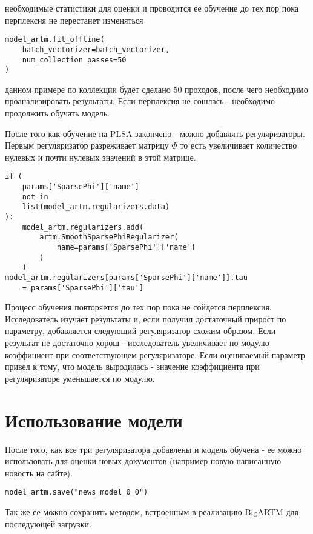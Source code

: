 необходимые статистики для оценки и проводится ее обучение до тех пор пока перплексия не перестанет изменяться

\begin{lstlisting}
model_artm.fit_offline(
    batch_vectorizer=batch_vectorizer, 
    num_collection_passes=50
)
\end{lstlisting}

 данном примере по коллекции будет сделано 50 проходов, после чего необходимо проанализировать результаты. Если перплексия не сошлась - необходимо продолжить обучать модель.

После того как обучение на PLSA закончено - можно добавлять регуляризаторы. Первым регуляризатор разреживает матрицу $\Phi$ то есть увеличивает количество нулевых и почти нулевых значений в этой матрице.

\begin{lstlisting}
if (
    params['SparsePhi']['name'] 
    not in 
    list(model_artm.regularizers.data)
):
    model_artm.regularizers.add(
        artm.SmoothSparsePhiRegularizer(
            name=params['SparsePhi']['name']
        )
    )
model_artm.regularizers[params['SparsePhi']['name']].tau 
    = params['SparsePhi']['tau']
\end{lstlisting}

Процесс обучения повторяется до тех пор пока не сойдется перплексия. Исследователь изучает результаты и, если получил достаточный прирост по параметру, добавляется следующий регуляризатор схожим образом. Если результат не достаточно хорош - исследователь увеличивает по модулю коэффициент при соответствующем регуляризаторе. Если оцениваемый параметр привел к тому, что модель выродилась - значение коэффициента при регуляризаторе уменьшается по модулю.

\section{Использование модели}

После того, как все три регуляризатора добавлены и модель обучена - ее можно использовать для оценки новых документов (например новую написанную новость на сайте).

\begin{lstlisting}
model_artm.save("news_model_0_0")
\end{lstlisting}

Так же ее можно сохранить методом, встроенным в реализацию BigARTM для последующей загрузки.

